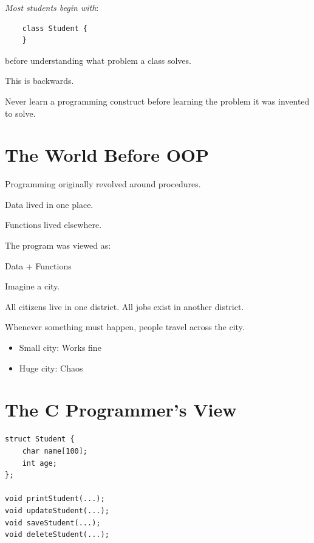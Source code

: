 \documentclass[11pt,a4paper]{book}
\begin{document}
\begin{trap}
\emph{Most students begin with}:

\begin{verbatim}
    class Student {
    }
\end{verbatim}

before understanding what problem a class solves.

This is backwards.
\end{trap}

\begin{rosettarule}
Never learn a programming construct before learning
the problem it was invented to solve.
\end{rosettarule}


\section{The World Before OOP}

\begin{idea}
Programming originally revolved around procedures.

Data lived in one place.

Functions lived elsewhere.

The program was viewed as:

Data
+
Functions
\end{idea}

\begin{mentalmodel}

Imagine a city.

All citizens live in one district.
All jobs exist in another district.

Whenever something must happen,
people travel across the city.
\begin{itemize}
\item [>]Small city:
Works fine
\item [>]Huge city:
Chaos
\end{itemize}
\end{mentalmodel}


\section{The C Programmer's View}

\begin{verbatim}
struct Student {
    char name[100];
    int age;
};

void printStudent(...);
void updateStudent(...);
void saveStudent(...);
void deleteStudent(...);
\end{verbatim}
\end{document}
